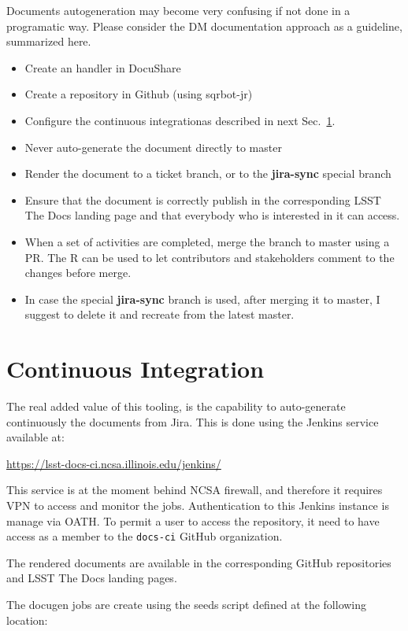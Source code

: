 \documentclass[DM]{lsstdoc}
\begin{document}
Documents autogeneration may become very confusing if not done in a programatic way.
Please consider the DM documentation approach as a guideline, summarized here.

\begin{itemize}
\item Create an handler in DocuShare
\item Create a repository in Github (using sqrbot-jr)
\item Configure the continuous integrationas described in next Sec.~\ref{sec:ci}.
\item Never auto-generate the document directly to master
\item Render the document to a ticket branch, or to the \textbf{jira-sync} special branch
\item Ensure that the document is correctly publish in the corresponding LSST The Docs landing page and that everybody who is interested in it can access.
\item When a set of activities are completed, merge the branch to master using a PR. The R can be used to let contributors and stakeholders comment to the changes before merge.
\item In case the special \textbf{jira-sync} branch is used, after merging it to master, I suggest to delete it  and recreate from the latest master.
\end{itemize}



\section{Continuous Integration}\label{sec:ci}

The real added value of this tooling, is the capability to auto-generate continuously the documents from Jira.
This is done using the Jenkins service available at:

\url{https://lsst-docs-ci.ncsa.illinois.edu/jenkins/}

This service is at the moment behind NCSA firewall, and therefore it requires VPN to access and monitor the jobs.
Authentication to this Jenkins instance is manage via OATH.
To permit a user to access the repository, it need to have access as a member to the \texttt{docs-ci} GitHub organization.

The rendered documents are available in the corresponding GitHub repositories and LSST The Docs landing pages.

The docugen jobs are create using the seeds script defined at the following location:
\end{document}
